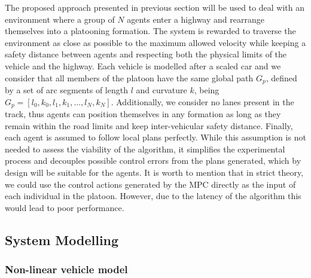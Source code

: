 \documentclass[letterpaper, 10 pt, conference]{ieeeconf}  %
\begin{document}
The proposed approach presented in previous section will be used to deal with an environment where a group of $N$ agents enter a highway and rearrange themselves into a platooning formation. The system is rewarded to traverse the environment as close as possible to the maximum allowed velocity while keeping a safety distance between agents and respecting both the physical limits of the vehicle and the highway. Each vehicle is modelled after a scaled car and we consider that all members of the platoon have the same global path $G_p$, defined by a set of arc segments of length $l$ and curvature $k$, being $G_p = [l_0, k_0,l_1, k_1, ... , l_N, k_N]$.  Additionally, we consider no lanes present in the track, thus agents can position themselves in any formation as long as they remain within the road limits and keep inter-vehicular safety distance. Finally, each agent is assumed to follow local plans perfectly. While this assumption is not needed to assess the viability of the algorithm, it simplifies the experimental process and decouples possible control errors from the plans generated, which by design will be suitable for the agents. It is worth to mention that in strict theory, we could use the control actions generated by the MPC directly as the input of each individual in the platoon. However, due to the latency of the algorithm this would lead to poor performance. 

\subsection{System Modelling}
\label{sec:modeling}

\subsubsection{Non-linear vehicle model}
\label{sec:NL_model}
\end{document}
